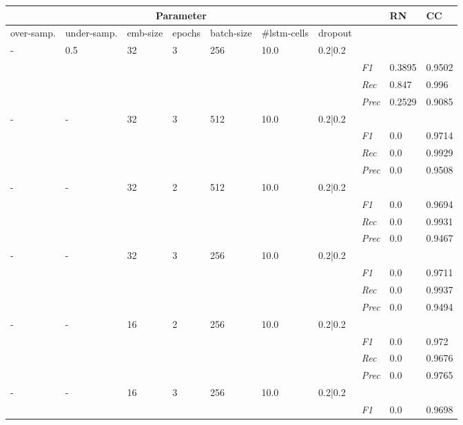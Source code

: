 \begin{table}[]
\tiny
\tabcolsep=0.11cm
\begin{tabularx}{\textwidth}{XXXXXXX|X|X|X}
\toprule
\multicolumn{7}{c}{Parameter} & & RN & CC \\ \midrule
over-\newline samp. & under-\newline samp. & emb-\newline size & epochs &batch-\newline size & \#lstm-\newline cells & dropout & & & \\ \midrule
- & 0.5 & 32 & 3 & 256 &10.0 & 0.2|0.2 & & & \\
& & & & & & & \textit{F1} & 0.3895 & 0.9502        \\
& & & & & & & \textit{Rec} &  0.847 & 0.996    \\
& & & & & & & \textit{Prec} & 0.2529 & 0.9085  \\ \midrule
- & - & 32 & 3 & 512 &10.0 & 0.2|0.2 & & & \\
& & & & & & & \textit{F1} & 0.0 & 0.9714        \\
& & & & & & & \textit{Rec} &  0.0 & 0.9929    \\
& & & & & & & \textit{Prec} & 0.0 & 0.9508  \\ \midrule
- & - & 32 & 2 & 512 &10.0 & 0.2|0.2 & & & \\
& & & & & & & \textit{F1} & 0.0 & 0.9694        \\
& & & & & & & \textit{Rec} &  0.0 & 0.9931    \\
& & & & & & & \textit{Prec} & 0.0 & 0.9467  \\ \midrule
- & - & 32 & 3 & 256 &10.0 & 0.2|0.2 & & & \\
& & & & & & & \textit{F1} & 0.0 & 0.9711        \\
& & & & & & & \textit{Rec} &  0.0 & 0.9937    \\
& & & & & & & \textit{Prec} & 0.0 & 0.9494  \\ \midrule
- & - & 16 & 2 & 256 &10.0 & 0.2|0.2 & & & \\
& & & & & & & \textit{F1} & 0.0 & 0.972        \\
& & & & & & & \textit{Rec} &  0.0 & 0.9676    \\
& & & & & & & \textit{Prec} & 0.0 & 0.9765  \\ \midrule
- & - & 16 & 3 & 256 &10.0 & 0.2|0.2 & & & \\
& & & & & & & \textit{F1} & 0.0 & 0.9698        \\

\end{tabularx}
\end{table}
